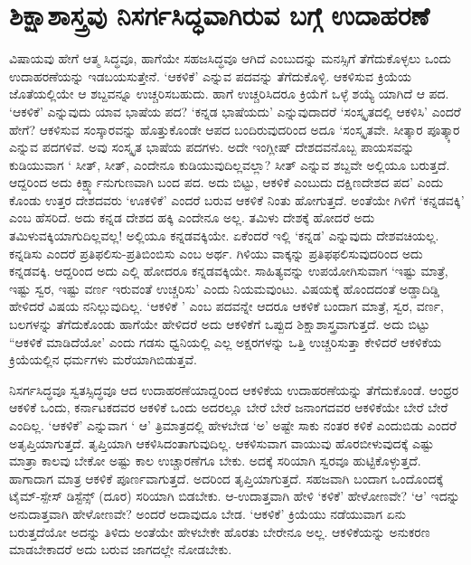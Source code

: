 \section*{ಶಿಕ್ಷಾಶಾಸ್ತ್ರವು  ನಿಸರ್ಗಸಿದ್ಧವಾಗಿರುವ ಬಗ್ಗೆ  ಉದಾಹರಣೆ}

ವಿಷಾಯವು ಹೇಗೆ ಆತ್ಮ ಸಿದ್ಧವೂ, ಹಾಗೆಯೇ ಸಹಜಸಿದ್ಧವೂ  ಆಗಿದೆ ಎಂಬುದನ್ನು  ಮನಸ್ಸಿಗೆ ತೆಗೆದುಕೊಳ್ಳಲು ಒಂದು ಉದಾಹರಣೆಯನ್ನು  ಇಡಬಯಸುತ್ತೇನೆ. `ಆಕಳಿಕೆ' ಎನ್ನುವ ಪದವನ್ನು  ತೆಗೆದುಕೊಳ್ಳಿ.  ಆಕಳಿಸುವ ಕ್ರಿಯೆಯ ಜೊತೆಯಲ್ಲಿಯೇ ಆ ಶಬ್ದವನ್ನೂ  ಉಚ್ಚರಿಸಬಹುದು. ಹಾಗೆ ಉಚ್ಚರಿಸಿದರೂ ಕ್ರಿಯೆಗೆ ಒಳ್ಳೆ  ಶಯ್ಯೆ ಯಾಗಿದೆ  ಆ ಪದ. `ಆಕಳಿಕೆ' ಎನ್ನುವುದು ಯಾವ ಭಾಷೆಯ ಪದ? `ಕನ್ನಡ ಭಾಷೆಯದು'  ಎನ್ನುವುದಾದರೆ `ಸಂಸ್ಕೃತದಲ್ಲಿ  ಆಕಳಿಸಿ' ಎಂದರೆ ಹೇಗೆ? ಆಕಳಿಸುವ  ಸಂಸ್ಕಾರವನ್ನು  ಹೊತ್ತುಕೊಂಡೇ ಆಪದ ಬಂದಿರುವುದರಿಂದ ಅದೂ `ಸಂಸ್ಕೃತವೇ. ಸೀತ್ಕಾರ ಪೂತ್ಕ್ಕಾರ ಎನ್ನುವ ಪದಗಳಿವೆ. ಅವು ಸಂಸ್ಕೃತ  ಭಾಷೆಯ ಪದಗಳು. ಅದೇ ಇಂಗ್ಲೀಷ್  ದೇಶದವನೊಬ್ಬ ಪಾಯಸವನ್ನು  ಕುಡಿಯುವಾಗ ` ಸೀತ್, ಸೀತ್, ಎಂದೇನೂ ಕುಡಿಯುವುದಿಲ್ಲವಲ್ಲಾ? ಸೀತ್ ಎನ್ನುವ ಶಬ್ದವೇ ಅಲ್ಲಿಯೂ ಬರುತ್ತದೆ. ಆದ್ದರಿಂದ ಅದು ಕಿರ್ಕ್ಷ್ಯಾನುಗುಣವಾಗಿ ಬಂದ ಪದ. ಅದು ಬಿಟ್ಟು, ಆಕಳಿಕೆ  ಎಂಬುದು ದಕ್ಷಿಣದೇಶದ ಪದ' ಎಂದು ಕೊಂಡು  ಉತ್ತರ ದೇಶದವರು `ಊಕಳಿಕೆ' ಎಂದರೆ ಬರುವ ಆಕಳಿಕೆ  ನಿಂತು ಹೋಗುತ್ತದೆ. ಅಂತೆಯೇ ಗಿಳಿಗೆ  `ಕನ್ನಡವಕ್ಕಿ' ಎಂಬ ಹೆಸರಿದೆ. ಅದು ಕನ್ನಡ ದೇಶದ ಹಕ್ಕಿ ಎಂದೇನೂ ಅಲ್ಲ. ತಮಿಳು  ದೇಶಕ್ಕೆ ಹೋದರೆ ಅದು ತಮಿಳುವಕ್ಕಿಯಾಗುದಿಲ್ಲವಲ್ಲ! ಅಲ್ಲಿಯೂ ಕನ್ನಡವಕ್ಕಿಯೇ. ಏಕೆಂದರೆ ಇಲ್ಲಿ  `ಕನ್ನಡ' ಎನ್ನುವುದು ದೇಶವಚಿಯಲ್ಲ. ಕನ್ನಡಿಸು ಎಂದರೆ ಪ್ರತಿಫಲಿಸು-ಪ್ರತಿಬಿಂಬಿಸು ಎಂಬ ಅರ್ಥ. ಗಿಳಿಯು ವಾಕ್ಕನ್ನು  ಪ್ರತಿಫಫಲಿಸುವುದರಿಂದ ಅದು ಕನ್ನಡವಕ್ಕಿ. ಆದ್ದರಿಂದ ಅದು ಎಲ್ಲಿ ಹೋದರೂ ಕನ್ನಡವಕ್ಕಿಯೇ. ಸಾಹಿತ್ಯವನ್ನು ಉಪಯೋಗಿಸುವಾಗ `ಇಷ್ಟು ಮಾತ್ರೆ,  ಇಷ್ಟು ಸ್ವರ, ಇಷ್ಟು  ವರ್ಣ ಇರುವಂತೆ ಉಚ್ಚರಿಸು' ಎಂದು ನಿಯಮವುಂಟು. ವಿಷಯಕ್ಕೆ ಹೊಂದದಂತೆ ಅಡ್ಡಾದಿಡ್ಡಿ ಹೇಳಿದರೆ ವಿಷಯ ನನಿಲ್ಲುವುದಿಲ್ಲ.  `ಆಕಳಿಕೆ ' ಎಂಬ ಪದವನ್ನೇ ಆದರೂ ಆಕಳಿಕೆ  ಬಂದಾಗ ಮಾತ್ರೆ, ಸ್ವರ, ವರ್ಣ, ಬಲಗಳನ್ನು  ತೆಗೆದುಕೊಂಡು ಹಾಗೆಯೇ ಹೇಳಿದರೆ ಅದು ಆಕಳಿಕೆಗೆ ಒಪ್ಪುದ  ಶಿಕ್ಷಾಶಾಸ್ತ್ರವಾಗುತ್ತದೆ. ಅದು ಬಿಟ್ಟು  ``ಆಕಳಿಕೆ  ಮಾಡಿದೆಯೋ' ಎಂದು  ಗಡಸು ಧ್ವನಿಯಲ್ಲಿ  ಎಲ್ಲ  ಅಕ್ಷರಗಳನ್ನು  ಒತ್ತಿ  ಉಚ್ಚರಿಸುತ್ತಾ ಕೇಳಿದರೆ  ಆಕಳಿಕೆಯ ಕ್ರಿಯೆಯಲ್ಲಿನ  ಧರ್ಮಗಳು ಮರೆಯಾಗಿಬಿಡುತ್ತವೆ. 

ನಿಸರ್ಗಸಿದ್ಧವೂ ಸ್ವತಸ್ಸಿದ್ಧವೂ  ಆದ ಉದಾಹರಣೆಯಾದ್ದರಿಂದ ಆಕಳಿಕೆಯ ಉದಾಹರಣೆಯನ್ನು  ತೆಗೆದುಕೊಂಡೆ. ಆಂಧ್ರರ ಆಕಳಿಕೆ  ಒಂದು, ಕರ್ನಾಟಕದವರ ಆಕಳಿಕೆ ಒಂದು ಅದರಲ್ಲೂ ಬೇರೆ ಬೇರೆ ಜನಾಂಗದವರ  ಆಕಳಿಕೆಯೇ ಬೇರೆ ಬೇರೆ ಎಂದಿಲ್ಲ. `ಆಕಳಿಕೆ' ಎನ್ನುವಾಗ ` ಆ' ತ್ರಿಮಾತ್ರದಲ್ಲಿ  ಹೇಳಬೇಡ `ಅ'  ಅಷ್ಟೇ ಸಾಕು ನಂತರ ಕಳಿಕೆ  ಎಂದುಬಿಡು  ಎಂದರೆ  ಅತೃಪ್ತಿಯಾಗುತ್ತದೆ. ತೃಪ್ತಿಯಾಗಿ ಆಕಳಿಸಿದಂತಾಗುವುದಿಲ್ಲ. ಆಕಳಿಸುವಾಗ ವಾಯುವು ಹೊರಬೀಳುವುದಕ್ಕೆ  ಎಷ್ಟು  ಮಾತ್ರಾ ಕಾಲವು  ಬೇಕೋ ಅಷ್ಟು  ಕಾಲ ಉಚ್ಚಾರಣೆಗೂ ಬೇಕು. ಅದಕ್ಕೆ   ಸರಿಯಾಗಿ  ಸ್ವರವೂ ಹುಟ್ಟಿಕೊಳ್ಳುತ್ತದೆ. ಹಾಗಾದಾಗ ಮಾತ್ರ  ಆಕಳಿಕೆ  ಪೂರ್ಣವಾಗುತ್ತದೆ. ಅದರಿಂದ ತೃಪ್ತಿಯಾಗುತ್ತದೆ. ಸಹಜವಾಗಿ ಬಂದಾಗ ಒಂದೊಂದಕ್ಕೆ  ಟೈಮ್-ಸ್ಪೇಸ್ ಡಿಸ್ಟೆನ್ಸ್  (ದೂರ) ಸರಿಯಾಗಿ ಬಿಡಬೇಕು. ಆ-ಉದಾತ್ತವಾಗಿ ಹೇಳಿ `ಕಳಿಕೆ' ಹೇಳೋಣವೇ?  `ಆ' ಇದನ್ನು  ಅನುದಾತ್ತವಾಗಿ ಹೇಳೋಣವೇ? ಅಂದರೆ ಅದಾವುದೂ ಬೇಡ. `ಆಕಳಿಕೆ' ಕ್ರಿಯೆಯು ನಡೆಯುವಾಗ ಏನು ಬರುತ್ತದೆಯೋ ಅದನ್ನು  ತಿಳಿದು ಅಂತೆಯೇ ಹೇಳಬೇಕೇ ಹೊರತು ಬೇರೇನೂ ಅಲ್ಲ. ಆಕಳಿಕೆಯನ್ನು  ಅನುಕರಣ ಮಾಡಬೇಕಾದರೆ ಅದು ಬರುವ ಜಾಗದಲ್ಲೇ ನೋಡಬೇಕು.

